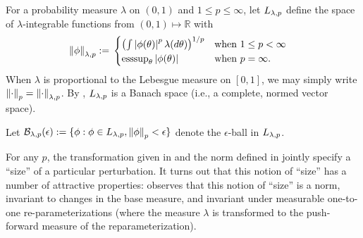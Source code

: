 
\begin{defn}
%
For a probability measure $\lambda$ on $(0,1)$ and $1 \le p \le \infty$, let
${L_{\lambda,p}}$ define the space of $\lambda$-integrable functions from
$(0,1)\mapsto\mathbb{R}$ with
%
\begin{align*}
%
\norm{\phi}_{\lambda,p} :={}&
\begin{cases}
    \left(\int \abs{\phi(\theta)}^p \lambda(d\theta)\right)^{1/p}
    & \textrm{when }1\le p < \infty\\
    \esssup_{\theta} \abs{\phi(\theta)}
    & \textrm{when }p = \infty.
\end{cases}
%
\end{align*}
%
When $\lambda$ is proportional to the  Lebesgue measure on $[0,1]$, we may
simply write $\left\Vert\cdot\right\Vert_{p} = \left\Vert\cdot\right\Vert_{\lambda,p}$.
%
By \citep[Theorem 5.2.1]{dudley:2018:real}, ${L_{\lambda,p}}$ is a Banach
space (i.e., a complete, normed vector space).

Let $\mathcal{B}_{\lambda,p}(\epsilon) := \{\phi: \phi \in {L_{\lambda, p}},
\left\Vert\phi\right\Vert_p < \epsilon \}$ denote the $\epsilon$-ball in ${L_{\lambda, p}}$.
%
\end{defn}


For any $p$, the transformation given in  and the norm
defined in  jointly specify a ``size'' of a particular
perturbation.   It turns out that this notion of ``size'' has a number of
attractive properties: \citep[Result 2]{gustafson:1996:local} observes that this
notion of ``size'' is a norm, invariant to changes in the base measure, and
invariant under measurable one-to-one re-parameterizations (where the measure
$\lambda$ is transformed to the push-forward measure of the reparameterization).


